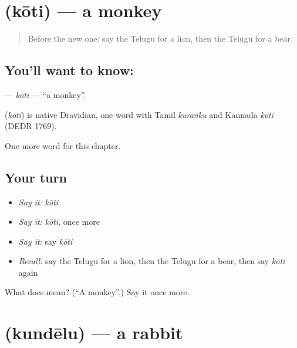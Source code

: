 \section[\texorpdfstring{\te{కోతి} (kōti)}{కోతి (kōti)}]{ (kōti) — a monkey}

\label{lesson:TE-C123-koti}



\begin{quote}
Before the new one: say the Telugu for a lion, then the Telugu for a bear.
\end{quote}

\subsection*{You'll want to know: }
\textbf{} — \emph{kōti} — \textquotedblleft{}a monkey\textquotedblright{}.

\begin{cousinweb}
\textbf{} (\emph{kōti}) is native Dravidian, one word with Tamil \emph{kuraṅku} and Kannada \emph{kōti} (DEDR 1769).
\end{cousinweb}

\begin{grammarlens}[title={What you've built}]
One more word for this chapter.
\end{grammarlens}

\subsection*{Your turn}
\begin{itemize}
\raggedright
  \item \emph{Say it:} \emph{kōti}
  \item \emph{Say it:} \emph{kōti}, once more
  \item \emph{Say it:} say \emph{kōti}
  \item \emph{Recall:} say the Telugu for a lion, then the Telugu for a bear, then say \emph{kōti} again
\end{itemize}

\begin{tcolorbox}[breakable,colback=teal!4,colframe=teal!35!black,title={Before you move on}]
What does  mean? (\textquotedblleft{}A monkey\textquotedblright{}.) Say it once more.
\end{tcolorbox}
\section[\texorpdfstring{\te{కుందేలు} (kundēlu)}{కుందేలు (kundēlu)}]{ (kundēlu) — a rabbit}

